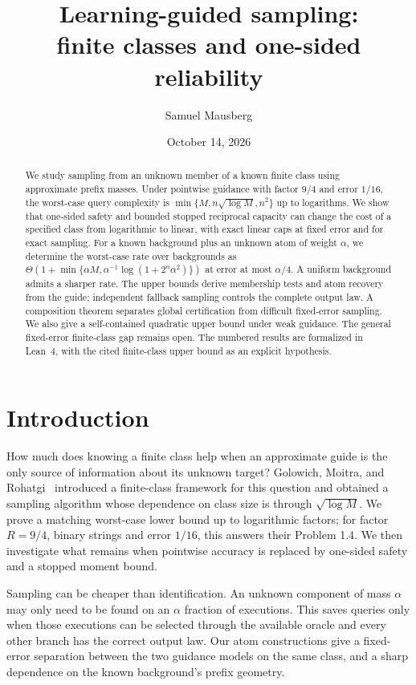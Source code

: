 \documentclass[11pt]{article}
\title{Learning-guided sampling:\\finite classes and one-sided reliability}
\author{Samuel Mausberg}
\date{October 14, 2026}
\theoremstyle{definition}\newtheorem{definition}[theorem]{Definition}
\theoremstyle{remark}\newtheorem{remark}[theorem]{Remark}
\begin{document}
\maketitle
\begin{abstract}
We study sampling from an unknown member of a known finite class using approximate prefix masses. Under pointwise guidance with factor $9/4$ and error $1/16$, the worst-case query complexity is $\min\{M,n\sqrt{\log M},n^2\}$ up to logarithms. We show that one-sided safety and bounded stopped reciprocal capacity can change the cost of a specified class from logarithmic to linear, with exact linear caps at fixed error and for exact sampling. For a known background plus an unknown atom of weight $\alpha$, we determine the worst-case rate over backgrounds as $\Theta(1+\min\{\alpha M,\alpha^{-1}\log(1+2^n\alpha^2)\})$ at error at most $\alpha/4$. A uniform background admits a sharper rate. The upper bounds derive membership tests and atom recovery from the guide; independent fallback sampling controls the complete output law. A composition theorem separates global certification from difficult fixed-error sampling. We also give a self-contained quadratic upper bound under weak guidance. The general fixed-error finite-class gap remains open. The numbered results are formalized in Lean~4, with the cited finite-class upper bound as an explicit hypothesis.
\end{abstract}

\section{Introduction}
How much does knowing a finite class help when an approximate guide is the only source of information about its unknown target? Golowich, Moitra, and Rohatgi~\cite{gmr} introduced a finite-class framework for this question and obtained a sampling algorithm whose dependence on class size is through $\sqrt{\log M}$. We prove a matching worst-case lower bound up to logarithmic factors; for factor $R=9/4$, binary strings and error $1/16$, this answers their Problem 1.4. We then investigate what remains when pointwise accuracy is replaced by one-sided safety and a stopped moment bound.

Sampling can be cheaper than identification. An unknown component of mass $\alpha$ may only need to be found on an $\alpha$ fraction of executions. This saves queries only when those executions can be selected through the available oracle and every other branch has the correct output law. Our atom constructions give a fixed-error separation between the two guidance models on the same class, and a sharp dependence on the known background's prefix geometry.
\end{document}

